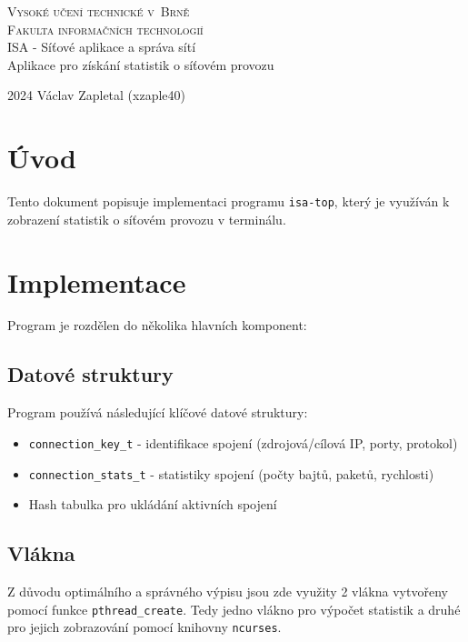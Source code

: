 \documentclass[a4paper,11pt]{article}
\theoremstyle{definition}
\begin{document}
\begin{titlepage}
    \begin{center}
        \Huge
        \textsc{Vysoké učení technické v~Brně\\
        \huge Fakulta informačních technologií}\\
        \LARGE ISA - Síťové aplikace a správa sítí\\
        Aplikace pro získání statistik o síťovém provozu
    \end{center}
    {\Large 2024 \hfill Václav Zapletal (xzaple40)}
\end{titlepage}

\tableofcontents
\newpage

\section{Úvod}
Tento dokument popisuje implementaci programu \texttt{isa-top}, který je využíván k zobrazení statistik o síťovém provozu v terminálu.


\section{Implementace}
Program je rozdělen do několika hlavních komponent:
\subsection{Datové struktury}
Program používá následující klíčové datové struktury:
\begin{itemize}
    \item \texttt{connection\_key\_t} - identifikace spojení (zdrojová/cílová IP, porty, protokol)
    \item \texttt{connection\_stats\_t} - statistiky spojení (počty bajtů, paketů, rychlosti)
    \item Hash tabulka pro ukládání aktivních spojení
\end{itemize}
\subsection{Vlákna}
Z důvodu optimálního a správného výpisu jsou zde využity 2 vlákna vytvořeny pomocí funkce \texttt{pthread\_create}. Tedy jedno vlákno pro výpočet statistik a druhé pro jejich zobrazování pomocí knihovny \texttt{ncurses}.
\end{document}
